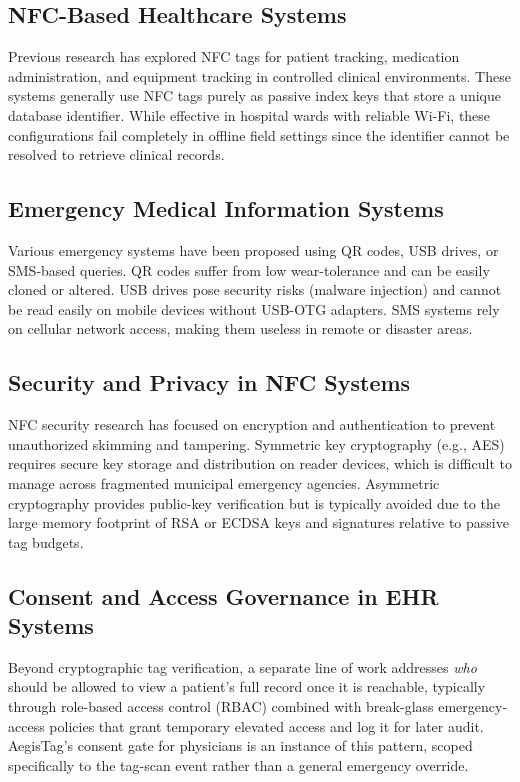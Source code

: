 \documentclass[conference]{IEEEtran}
\begin{document}
\subsection{NFC-Based Healthcare Systems}
Previous research has explored NFC tags for patient tracking, medication administration, and equipment tracking in controlled clinical environments. These systems generally use NFC tags purely as passive index keys that store a unique database identifier. While effective in hospital wards with reliable Wi-Fi, these configurations fail completely in offline field settings since the identifier cannot be resolved to retrieve clinical records.

\subsection{Emergency Medical Information Systems}
Various emergency systems have been proposed using QR codes, USB drives, or SMS-based queries. QR codes suffer from low wear-tolerance and can be easily cloned or altered. USB drives pose security risks (malware injection) and cannot be read easily on mobile devices without USB-OTG adapters. SMS systems rely on cellular network access, making them useless in remote or disaster areas.

\subsection{Security and Privacy in NFC Systems}
NFC security research has focused on encryption and authentication to prevent unauthorized skimming and tampering. Symmetric key cryptography (e.g., AES) requires secure key storage and distribution on reader devices, which is difficult to manage across fragmented municipal emergency agencies. Asymmetric cryptography provides public-key verification but is typically avoided due to the large memory footprint of RSA or ECDSA keys and signatures relative to passive tag budgets.

\subsection{Consent and Access Governance in EHR Systems}
Beyond cryptographic tag verification, a separate line of work addresses \textit{who} should be allowed to view a patient's full record once it is reachable, typically through role-based access control (RBAC) combined with break-glass emergency-access policies that grant temporary elevated access and log it for later audit. AegisTag's consent gate for physicians is an instance of this pattern, scoped specifically to the tag-scan event rather than a general emergency override.
\end{document}
